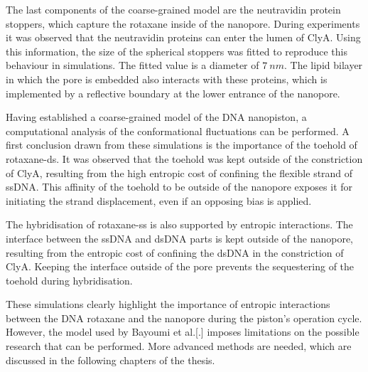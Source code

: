 The last components of the coarse-grained model are the neutravidin protein stoppers,
which capture the rotaxane inside of the nanopore. During experiments it was observed
that the neutravidin proteins can enter the lumen of ClyA. Using this information, the
size of the spherical stoppers was fitted to reproduce this behaviour in simulations.
The fitted value is a diameter of $7\ nm$. The lipid bilayer in which the pore is
embedded also interacts with these proteins, which is implemented by a reflective
boundary at the lower entrance of the nanopore.

Having established a coarse-grained model of the DNA nanopiston, a computational analysis
of the conformational fluctuations can be performed. A first conclusion drawn from these
simulations is the importance of the toehold of rotaxane-ds. It was observed
that the toehold was kept outside of the constriction of ClyA, resulting from the high
entropic cost of confining the flexible strand of ssDNA. This affinity of the toehold to
be outside of the nanopore exposes it for initiating the strand displacement, even if an
opposing bias is applied.

The hybridisation of rotaxane-ss is also supported by entropic interactions. The
interface between the ssDNA and dsDNA parts is kept outside of the nanopore, resulting
from the entropic cost of confining the dsDNA in the constriction of ClyA. Keeping the
interface outside of the pore prevents the sequestering of the toehold during
hybridisation.

These simulations clearly highlight the importance of entropic interactions between the
DNA rotaxane and the nanopore during the piston's operation cycle. However, the model
used by Bayoumi et al.[.] imposes limitations on the possible research that can be
performed. More advanced methods are needed, which are discussed in the following
chapters of the thesis.\\\\


